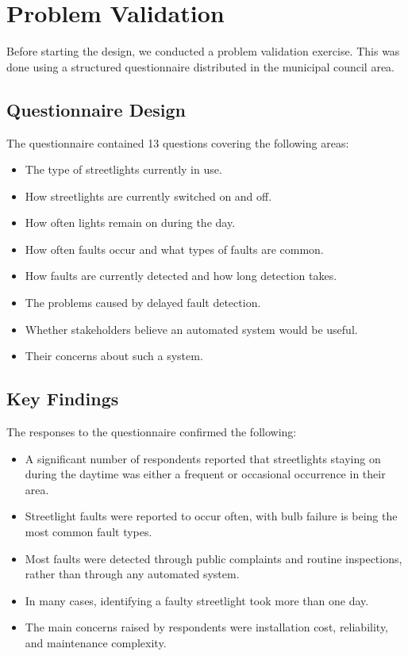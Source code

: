 \documentclass{article}
\begin{document}
\section{Problem Validation}

Before starting the design, we conducted a problem validation exercise. This was done using a structured questionnaire distributed in the municipal council area.

\subsection{Questionnaire Design}

The questionnaire contained 13 questions covering the following areas:
\begin{itemize}
    \item The type of streetlights currently in use.
    \item How streetlights are currently switched on and off.
    \item How often lights remain on during the day.
    \item How often faults occur and what types of faults are common.
    \item How faults are currently detected and how long detection takes.
    \item The problems caused by delayed fault detection.
    \item Whether stakeholders believe an automated system would be useful.
    \item Their concerns about such a system.
\end{itemize}

\subsection{Key Findings}

The responses to the questionnaire confirmed the following:
\begin{itemize}
    \item A significant number of respondents reported that streetlights staying on during the daytime was either a frequent or occasional occurrence in their area.
    \item Streetlight faults were reported to occur often, with bulb failure is being the most common fault types.
    \item Most faults were detected through public complaints and routine inspections, rather than through any automated system.
    \item In many cases, identifying a faulty streetlight took more than one day.
    \item The main concerns raised by respondents were installation cost, reliability, and maintenance complexity.
\end{itemize}
\end{document}
